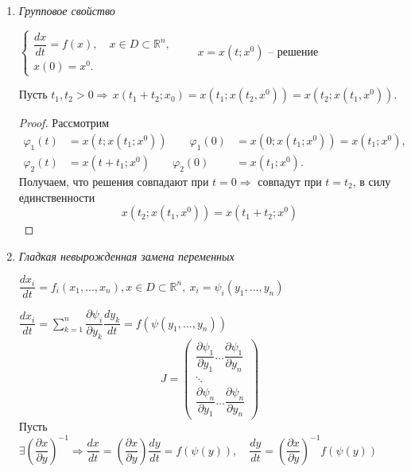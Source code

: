 \begin{enumerate}
\begin{proof}
 
Пусть $L$ -- длина замкнутой фазовой траектории. Имеем: $l(t)$  возрастает, $l(t)\leqslant\,L$. Тогда 
$$
\exists\,T:l(T)=L\Rightarrow L = \int\limits_{0}^{T}|f(\psi(t))|dt
$$
\end{proof}

Рассмотрим следующий пример:

$
\begin{cases}
\dot{x_1} = x_2\\
\dot{x_2} = -x_1
\end{cases}\Rightarrow
\dfrac{dx_1}{dx_2}=-\dfrac{x_2}{x_1}\Rightarrow
x_1^2+x_2^2 = R^2.
$

$\int\limits_{0}^{T}\sqrt{x_1^2+x_2^2}dt=\int\limits_{0}^{T}Rdt=RT\Rightarrow\,2\pi R=RT\Rightarrow T=2\pi.$
\item \textit{Групповое свойство}

$
\begin{cases}
\dfrac{dx}{dt}=f(x),\quad x\in D\subset\mathbb{R}^n,\\
x(0)=x^0.
\end{cases}
\qquad x=x(t;x^0)$  -- решение 

Пусть $t_1,t_2>0\Rightarrow\,x(t_1+t_2;x_0)=x(t_1;x(t_2,x^0))=x(t_2;x(t_1,x^0))$.
\begin{proof} Рассмотрим
$$
\begin{array}{rcl}
\varphi_1(t)&=x(t;x(t_1;x^0)) \qquad \varphi_1(0)&=x(0;x(t_1;x^0)) = x(t_1;x^0), \\
\varphi_2(t)&=x(t+t_1;x^0) 	 \qquad \varphi_2(0)&= x(t_1;x^0). 
\end{array}
$$
Получаем, что решения совпадают при $t=0\Rightarrow$ совпадут при $t=t_2$, в силу единственности
$$x(t_2;x(t_1,x^0))=x(t_1+t_2;x^0)$$ 
\end{proof}
\item \textit{Гладкая невырожденная замена переменных}

$\dfrac{dx_i}{dt}=f_i(x_1,...,x_n), x\in D\subset\mathbb{R}^n,\ x_i=\psi_i(y_1,...,y_n)$

$
\dfrac{dx_i}{dt}=\sum\limits_{k=1}^{n}\dfrac{\partial \psi_i}{\partial y_k}\dfrac{dy_k}{dt}=f(\psi(y_1,...,y_n))
$
$$
J=
\begin{pmatrix}
\dfrac{\partial \psi_1}{\partial y_1}\ldots\dfrac{\partial \psi_1}{\partial y_n}\\
\ddots\\
\dfrac{\partial \psi_n}{\partial y_1}\ldots\dfrac{\partial \psi_n}{\partial y_n}
\end{pmatrix}
$$
Пусть $\exists\left(\dfrac{\partial x}{\partial y}\right)^{-1}\Rightarrow
\dfrac{dx}{dt}=\left(\dfrac{\partial x}{\partial y}\right)\dfrac{dy}{dt}=f(\psi(y)),\quad \dfrac{dy}{dt} = \left(\dfrac{\partial x}{\partial y}\right)^{-1}f(\psi(y))
$
\end{enumerate}
